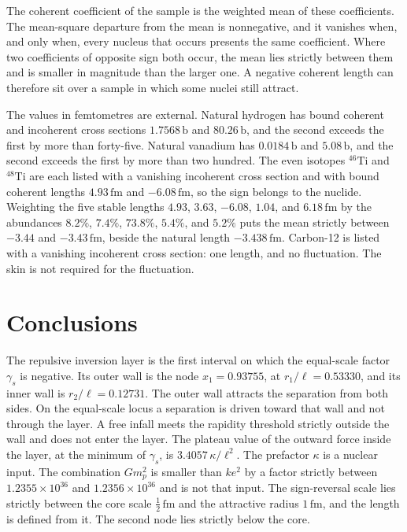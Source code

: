 \documentclass[a4paper]{article}
\begin{document}
The coherent coefficient of the sample is the weighted mean of these coefficients. The mean-square departure from the mean is nonnegative, and it vanishes when, and only when, every nucleus that occurs presents the same coefficient. Where two coefficients of opposite sign both occur, the mean lies strictly between them and is smaller in magnitude than the larger one. A negative coherent length can therefore sit over a sample in which some nuclei still attract.

The values in femtometres are external. Natural hydrogen has bound coherent and incoherent cross sections \(1.7568\,\mathrm{b}\) and \(80.26\,\mathrm{b}\), and the second exceeds the first by more than forty-five. Natural vanadium has \(0.0184\,\mathrm{b}\) and \(5.08\,\mathrm{b}\), and the second exceeds the first by more than two hundred. The even isotopes \({}^{46}\mathrm{Ti}\) and \({}^{48}\mathrm{Ti}\) are each listed with a vanishing incoherent cross section and with bound coherent lengths \(4.93\,\mathrm{fm}\) and \(-6.08\,\mathrm{fm}\), so the sign belongs to the nuclide. Weighting the five stable lengths \(4.93\), \(3.63\), \(-6.08\), \(1.04\), and \(6.18\,\mathrm{fm}\) by the abundances \(8.2\%\), \(7.4\%\), \(73.8\%\), \(5.4\%\), and \(5.2\%\) puts the mean strictly between \(-3.44\) and \(-3.43\,\mathrm{fm}\), beside the natural length \(-3.438\,\mathrm{fm}\). Carbon-12 is listed with a vanishing incoherent cross section: one length, and no fluctuation. The skin is not required for the fluctuation.

\section{Conclusions}
\label{sec:conclusions}

The repulsive inversion layer is the first interval on which the equal-scale factor \(\gamma_s\) is negative. Its outer wall is the node \(x_1=0.93755\), at \(r_1/\ell=0.53330\), and its inner wall is \(r_2/\ell=0.12731\). The outer wall attracts the separation from both sides. On the equal-scale locus a separation is driven toward that wall and not through the layer. A free infall meets the rapidity threshold strictly outside the wall and does not enter the layer. The plateau value of the outward force inside the layer, at the minimum of \(\gamma_s\), is \(3.4057\,\kappa/\ell^{2}\). The prefactor \(\kappa\) is a nuclear input. The combination \(G m_p^{2}\) is smaller than \(ke^{2}\) by a factor strictly between \(1.2355\times 10^{36}\) and \(1.2356\times 10^{36}\) and is not that input. The sign-reversal scale lies strictly between the core scale \(\tfrac12\,\mathrm{fm}\) and the attractive radius \(1\,\mathrm{fm}\), and the length is defined from it. The second node lies strictly below the core.
\end{document}

